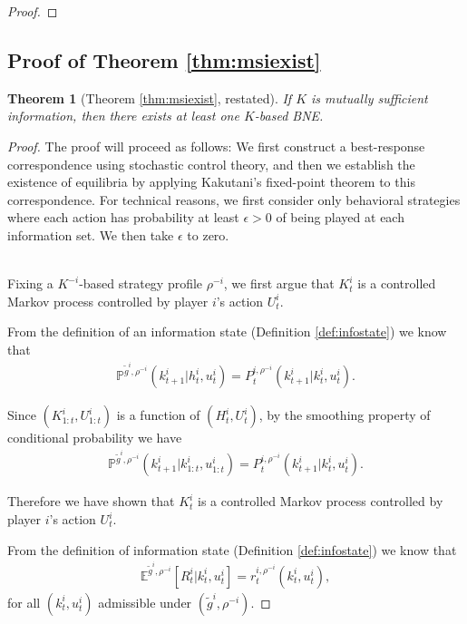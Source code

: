 \documentclass[pdflatex,sn-basic]{sn-jnl}
\newcommand{\E}{\mathbb{E}}
\renewcommand{\Pr}{\mathbb{P}}
\newcommand{\Comp}{K}
\newcommand{\comp}{k}
\theoremstyle{thmstyleone}%
\newtheorem{thm}{Theorem}
\theoremstyle{thmstyletwo}%
\theoremstyle{thmstylethree}%
\begin{document}
\begin{appendices}
\begin{proof}
\end{proof}

\subsection{Proof of Theorem \ref{thm:msiexist}}\label{app:thm:msiexist}

\begin{thm}[Theorem \ref{thm:msiexist}, restated]
	If $\Comp$ is mutually sufficient information, then there exists at least one $\Comp$-based BNE.
\end{thm}

\begin{proof}
{The proof will proceed as follows: We first construct a best-response correspondence using stochastic control theory, and then we establish the existence of equilibria by applying Kakutani's fixed-point theorem to this correspondence. For technical reasons, we first consider only behavioral strategies where each action has probability at least $\epsilon>0$ of being played at each information set. We then take $\epsilon$ to zero. }\\~

    Fixing {a $K^{-i}$-based strategy profile} $\rho^{-i}$, we first argue that $\Comp_t^i$ is a controlled Markov process controlled by player $i$'s action $U_t^i$. 
	
	From the definition of an information state (Definition \ref{def:infostate}) we know that
	\begin{align}
		\Pr^{\tilde{g}^i, \rho^{-i}}(\comp_{t+1}^i|h_t^i, u_t^i) = P_t^{i, \rho^{-i}}(\comp_{t+1}^i|\comp_t^i, u_t^i).
	\end{align}
	
	Since $(\Comp_{1:t}^i, U_{1:t}^i)$ is a function of $(H_t^i, U_t^i)$, by the smoothing property of conditional probability we have
	\begin{align}
		\Pr^{\tilde{g}^i, \rho^{-i}}(\comp_{t+1}^i|\comp_{1:t}^i, u_{1:t}^i) = P_t^{i, \rho^{-i}}(\comp_{t+1}^i|\comp_t^i, u_t^i).
	\end{align}
	
	Therefore we have shown that $\Comp_t^i$ is a controlled Markov process controlled by player $i$'s action $U_t^i$.
	
	From the definition of information state (Definition \ref{def:infostate}) we know that
	\begin{align}
		\E^{\tilde{g}^i, \rho^{-i}}\left[R_t^i|\comp_t^i, u_t^i \right] = r_t^{i, \rho^{-i}}(\comp_t^i, u_t^i),
	\end{align}
	for all $(\comp_t^i, u_t^i)$ admissible under $(\tilde{g}^i, \rho^{-i})$. 
	

\end{proof}
\end{appendices}
\end{document}
